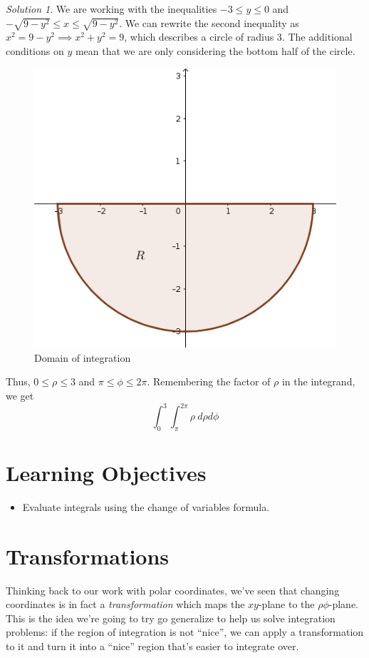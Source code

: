 \documentclass[
]{book}
\providecommand{\tightlist}{%
  \setlength{\itemsep}{0pt}\setlength{\parskip}{0pt}}
\theoremstyle{definition}
\theoremstyle{definition}
\theoremstyle{definition}
\theoremstyle{definition}
\theoremstyle{remark}
\newtheorem*{solution}{Solution}
\begin{document}
\begin{solution}

We are working with the inequalities \(-3\leq y\leq 0\) and \(-\sqrt{9-y^2}\leq x\leq \sqrt{9-y^2}\). We can rewrite the second inequality as \(x^2=9-y^2 \implies x^2+y^2=9\), which describes a circle of radius \(3\). The additional conditions on \(y\) mean that we are only considering the bottom half of the circle.

\begin{figure}

{\centering \includegraphics[width=0.3\linewidth]{images/lec-13-recap} 

}

\caption{Domain of integration}\label{fig:unnamed-chunk-28}
\end{figure}

Thus, \(0\leq \rho \leq 3\) and \(\pi\leq\phi\leq 2\pi\). Remembering the factor of \(\rho\) in the integrand, we get \[\int_{0}^3\int_{\pi}^{2\pi}\rho~d\rho d\phi\]

\end{solution}

\hypertarget{learning-objectives-12}{%
\section{Learning Objectives}\label{learning-objectives-12}}

\begin{itemize}
\tightlist
\item
  Evaluate integrals using the change of variables formula.
\end{itemize}

\hypertarget{transformations}{%
\section{Transformations}\label{transformations}}

Thinking back to our work with polar coordinates, we've seen that changing coordinates is in fact a \emph{transformation} which maps the \(xy\)-plane to the \(\rho\phi\)-plane. This is the idea we're going to try go generalize to help us solve integration problems: if the region of integration is not ``nice'', we can apply a transformation to it and turn it into a ``nice'' region that's easier to integrate over.
\end{document}
